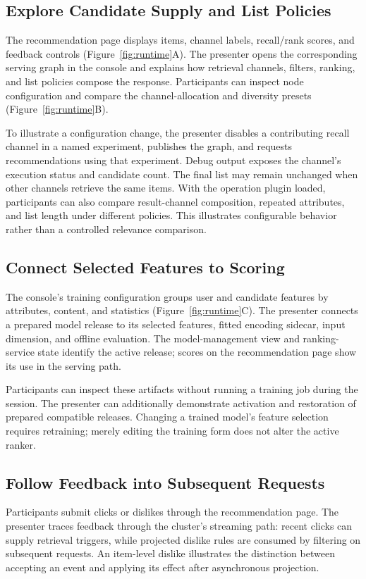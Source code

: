 \documentclass[sigconf,screen,review]{acmart}
\begin{document}
\subsection{Explore Candidate Supply and List Policies}
The recommendation page displays items, channel labels, recall/rank scores, and feedback controls (Figure~\ref{fig:runtime}A). The presenter opens the corresponding serving graph in the console and explains how retrieval channels, filters, ranking, and list policies compose the response. Participants can inspect node configuration and compare the channel-allocation and diversity presets (Figure~\ref{fig:runtime}B).

To illustrate a configuration change, the presenter disables a contributing recall channel in a named experiment, publishes the graph, and requests recommendations using that experiment. Debug output exposes the channel's execution status and candidate count. The final list may remain unchanged when other channels retrieve the same items. With the operation plugin loaded, participants can also compare result-channel composition, repeated attributes, and list length under different policies. This illustrates configurable behavior rather than a controlled relevance comparison.

\subsection{Connect Selected Features to Scoring}
The console's training configuration groups user and candidate features by attributes, content, and statistics (Figure~\ref{fig:runtime}C). The presenter connects a prepared model release to its selected features, fitted encoding sidecar, input dimension, and offline evaluation. The model-management view and ranking-service state identify the active release; scores on the recommendation page show its use in the serving path.

Participants can inspect these artifacts without running a training job during the session. The presenter can additionally demonstrate activation and restoration of prepared compatible releases. Changing a trained model's feature selection requires retraining; merely editing the training form does not alter the active ranker.

\subsection{Follow Feedback into Subsequent Requests}
Participants submit clicks or dislikes through the recommendation page. The presenter traces feedback through the cluster's streaming path: recent clicks can supply retrieval triggers, while projected dislike rules are consumed by filtering on subsequent requests. An item-level dislike illustrates the distinction between accepting an event and applying its effect after asynchronous projection.
\end{document}
